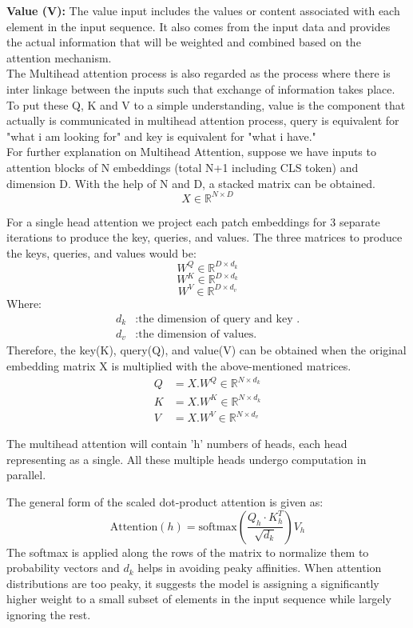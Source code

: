 \textbf{Value (V):} The value input includes the values or content associated with each element in the input sequence. It also comes from the input data and provides the actual information that will be weighted and combined based on the attention mechanism.\\

The Multihead attention process is also regarded as the process where there is inter linkage between the inputs such that exchange of information takes place. To put these Q, K and V to a simple understanding, value is the component that actually is communicated in multihead attention process, query is equivalent for "what i am looking for" and key is equivalent for "what i have."\\
For further explanation on Multihead Attention, suppose we have inputs to attention blocks of N embeddings (total N+1 including CLS token) and dimension D. With the help of N and D, a stacked matrix can be obtained.
\[ X \in \mathbb{R}^{N \times D}\]

For a single head attention we project each patch embeddings for 3 separate iterations to produce the key, queries, and values. The three matrices to produce the keys, queries, and values would be:
\[ W^Q \in \mathbb{R}^{D\times d_k}\]
\[ W^K \in \mathbb{R}^{D \times d_k}\]
\[ W^V \in \mathbb{R}^{D \times d_v}\]
Where:
\begin{align*}
    d_k & : \text{the dimension of query and key .} \\
    d_v & : \text{the dimension of values.}
\end{align*}
Therefore, the key(K), query(Q), and value(V) can be obtained when the original embedding matrix X is multiplied with the above-mentioned matrices.
\begin{align}
    Q & = X.W^Q \in \mathbb{R}^{N\times d_k} \\
    K & = X.W^K \in \mathbb{R}^{N\times d_k} \\
    V & = X.W^V \in \mathbb{R}^{N\times d_v}
\end{align}

The multihead attention will contain 'h' numbers of heads, each head representing as a single. All these multiple heads undergo computation in parallel.

The general form of the scaled dot-product attention is given as:
\begin{equation}
    \text{Attention}(h) = \text{softmax}\left(\frac{Q_h \cdot K_h ^T}{\sqrt{d_k}}\right) V_h
\end{equation}
The softmax is applied along the rows of the matrix to normalize them to probability vectors and $d_k$ helps in avoiding peaky affinities. When attention distributions are too peaky, it suggests the model is assigning a significantly higher weight to a small subset of elements in the input sequence while largely ignoring the rest.

